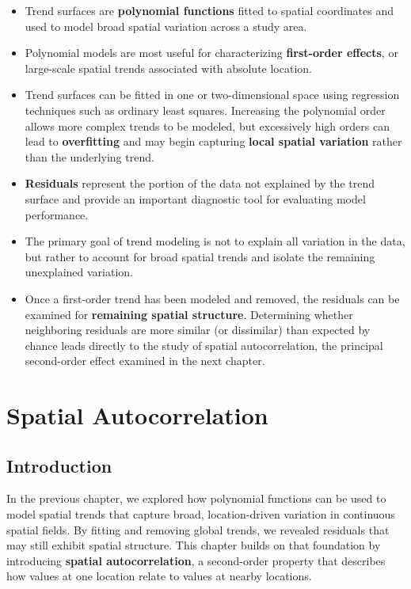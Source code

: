 \documentclass[
  letterpaper,
]{book}
\providecommand{\tightlist}{%
  \setlength{\itemsep}{0pt}\setlength{\parskip}{0pt}}
\begin{document}
\begin{itemize}
\tightlist
\item
  Trend surfaces are \textbf{polynomial functions} fitted to spatial
  coordinates and used to model broad spatial variation across a study
  area.
\item
  Polynomial models are most useful for characterizing
  \textbf{first-order effects}, or large-scale spatial trends associated
  with absolute location.
\item
  Trend surfaces can be fitted in one or two-dimensional space using
  regression techniques such as ordinary least squares. Increasing the
  polynomial order allows more complex trends to be modeled, but
  excessively high orders can lead to \textbf{overfitting} and may begin
  capturing \textbf{local spatial variation} rather than the underlying
  trend.
\item
  \textbf{Residuals} represent the portion of the data not explained by
  the trend surface and provide an important diagnostic tool for
  evaluating model performance.
\item
  The primary goal of trend modeling is not to explain all variation in
  the data, but rather to account for broad spatial trends and isolate
  the remaining unexplained variation.
\item
  Once a first-order trend has been modeled and removed, the residuals
  can be examined for \textbf{remaining spatial structure}. Determining
  whether neighboring residuals are more similar (or dissimilar) than
  expected by chance leads directly to the study of spatial
  autocorrelation, the principal second-order effect examined in the
  next chapter.
\end{itemize}

\chapter{Spatial Autocorrelation}\label{spatial-autocorrelation}

\section{Introduction}\label{introduction-12}

In the previous chapter, we explored how polynomial functions can be
used to model spatial trends that capture broad, location-driven
variation in continuous spatial fields. By fitting and removing global
trends, we revealed residuals that may still exhibit spatial structure.
This chapter builds on that foundation by introducing \textbf{spatial
autocorrelation}, a second-order property that describes how values at
one location relate to values at nearby locations.
\end{document}
